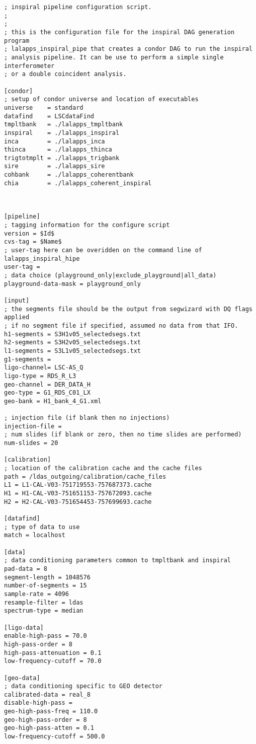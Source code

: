 \begin{verbatim}
; inspiral pipeline configuration script.
; 
;
; this is the configuration file for the inspiral DAG generation program 
; lalapps_inspiral_pipe that creates a condor DAG to run the inspiral
; analysis pipeline. It can be use to perform a simple single interferometer
; or a double coincident analysis.

[condor]
; setup of condor universe and location of executables
universe    = standard
datafind    = LSCdataFind
tmpltbank   = ./lalapps_tmpltbank
inspiral    = ./lalapps_inspiral
inca        = ./lalapps_inca
thinca      = ./lalapps_thinca
trigtotmplt = ./lalapps_trigbank
sire        = ./lalapps_sire
cohbank     = ./lalapps_coherentbank
chia        = ./lalapps_coherent_inspiral



[pipeline]
; tagging information for the configure script
version = $Id$
cvs-tag = $Name$
; user-tag here can be overidden on the command line of lalapps_inspiral_hipe
user-tag = 
; data choice (playground_only|exclude_playground|all_data)
playground-data-mask = playground_only

[input]
; the segments file should be the output from segwizard with DQ flags applied
; if no segment file if specified, assumed no data from that IFO.
h1-segments = S3H1v05_selectedsegs.txt
h2-segments = S3H2v05_selectedsegs.txt
l1-segments = S3L1v05_selectedsegs.txt
g1-segments = 
ligo-channel= LSC-AS_Q
ligo-type = RDS_R_L3
geo-channel = DER_DATA_H 
geo-type = G1_RDS_C01_LX
geo-bank = H1_bank_4_G1.xml

; injection file (if blank then no injections)
injection-file =
; num slides (if blank or zero, then no time slides are performed)
num-slides = 20

[calibration]
; location of the calibration cache and the cache files
path = /ldas_outgoing/calibration/cache_files
L1 = L1-CAL-V03-751719553-757687373.cache
H1 = H1-CAL-V03-751651153-757672093.cache
H2 = H2-CAL-V03-751654453-757699693.cache

[datafind]
; type of data to use
match = localhost

[data]
; data conditioning parameters common to tmpltbank and inspiral
pad-data = 8
segment-length = 1048576
number-of-segments = 15
sample-rate = 4096
resample-filter = ldas
spectrum-type = median

[ligo-data]
enable-high-pass = 70.0
high-pass-order = 8
high-pass-attenuation = 0.1
low-frequency-cutoff = 70.0

[geo-data]
; data conditioning specific to GEO detector
calibrated-data = real_8
disable-high-pass = 
geo-high-pass-freq = 110.0
geo-high-pass-order = 8
geo-high-pass-atten = 0.1
low-frequency-cutoff = 500.0


\end{verbatim}
